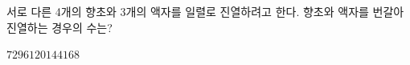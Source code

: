 서로 다른 4개의 향초와 3개의 액자를 일렬로 진열하려고 한다. 향초와 액자를 번갈아 진열하는 경우의 수는?
\begin{choices32}{$72$}{$96$}{$120$}{$144$}{$168$}\end{choices32}
